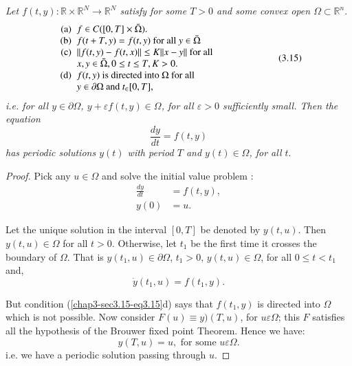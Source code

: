 \textit{Let $f(t,y): \mathbb{R} \times \mathbb{R}^N \to \mathbb{R}^N$
  satisfy for some $T> 0$ and some convex open $\Omega \subset
  \mathbb{R}^n$}. 
\begin{equation*}
\begin{array}{r@{\;\;}>{$}p{6.5cm}<{$}}
\text{(a)} & f \in C([0,T] \times
\bar{\Omega}).\\
\text{(b)} & f(t+T,y) = f(t,y) \text{ for all } y
\in\bar{\Omega}\\ 
\text{(c)} & ||f(t,y)-f(t,x)|| \leq K ||x-y|| \text{ for all}\newline x, y
\in \bar{\Omega}, 0 \leq t \leq T, K > 0.\\
\text{(d)} & f(t,y) \text{ is directed into } \Omega  \text{ for all}\newline
 y \in \partial \Omega \text{ and } t_{\in}[0,T],
\end{array}\tag{3.15}\label{chap3-sec3.15-eq3.15}
\end{equation*}
\textit{i.e. for all $y \in \partial \Omega$, $y+ \varepsilon
  f(t,y) \in \Omega$, for all $\varepsilon> 0$ sufficiently
  small. Then the equation} 
\begin{equation*}
\frac{dy}{dt}= f(t,y) \tag{3.15e}\label{chap3-sec3.15-eq3.15e} 
\end{equation*}
\textit{has periodic solutions $y(t) $ with period $T$ and $y(t)
  \in \Omega$, for all $t$}. 

\begin{proof}
Pick any $u \in \Omega $ and solve the initial value problem : 
\begin{align*}
\frac{dy}{dt}& = f(t,y),\\
y(0) & = u.
\end{align*}

Let the unique solution in the interval $[0,T]$ be denoted by
$y(t,u)$. Then $y(t,u) \in\Omega$ for all $t > 0$. Otherwise,
let $t_1$ be the first time it crosses the boundary of $\Omega$. That
is $y(t_1, u) \in \partial \Omega$, $t_1 > 0$, $y(t,u) \in
\Omega$, for all $0 \leq t < t_1$ and,  
$$
\dot{y}(t_1,u) = f(t_1,y). 
$$


But condition (\ref{chap3-sec3.15-eq3.15}d) says that $f(t_1,y)$ is
directed into $\Omega$ 
which is not possible. Now consider $F(u) \equiv y)(T,u)$, for $u
\varepsilon\Omega$; this $F$ satisfies all the hypothesis of the
Brouwer fixed point Theorem. Hence we have: 
$$
y(T,u) = u, \text{ \ for some\ } u \varepsilon\Omega. 
$$\pageoriginale
i.e. we have a periodic solution passing through $u$.
\end{proof}

